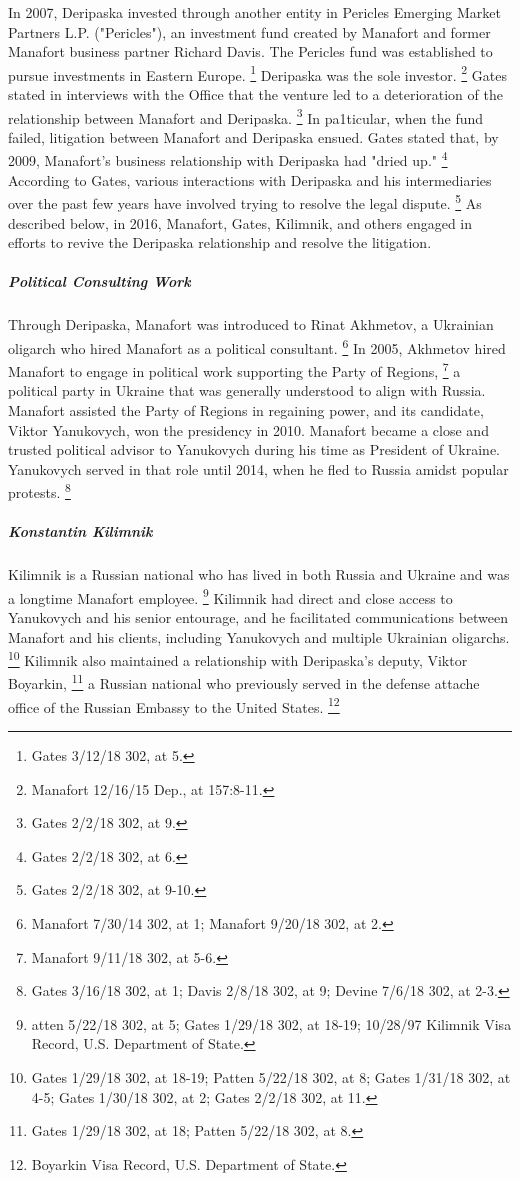 In 2007, Deripaska invested through another entity in Pericles Emerging Market Partners L.P. ("Pericles"), an investment fund created by Manafort and former Manafort business partner Richard Davis.
The Pericles fund was established to pursue investments in Eastern Europe.%
\footnote{Gates 3/12/18 302, at 5.}
Deripaska was the sole investor.%
\footnote{Manafort 12/16/15 Dep., at 157:8-11.}
Gates stated in interviews with the Office that the venture led to a deterioration of the relationship between Manafort and Deripaska.%
\footnote{Gates 2/2/18 302, at 9.}
In pa1ticular, when the fund failed, litigation between Manafort and Deripaska ensued.
Gates stated that, by 2009, Manafort's business relationship with Deripaska had "dried up."%
\footnote{Gates 2/2/18 302, at 6.}
According to Gates, various interactions with Deripaska and his intermediaries over the past few years have involved trying to resolve the legal dispute.%
\footnote{Gates 2/2/18 302, at 9-10.}
As described below, in 2016, Manafort, Gates, Kilimnik, and others engaged in efforts to revive the Deripaska relationship and resolve the litigation.

\subparagraph{Political Consulting Work}

Through Deripaska, Manafort was introduced to Rinat Akhmetov, a Ukrainian oligarch who hired Manafort as a political consultant.%
\footnote{Manafort 7/30/14 302, at 1;
Manafort 9/20/18 302, at 2.}
In 2005, Akhmetov hired Manafort to engage in political work supporting the Party of Regions,%
\footnote{Manafort 9/11/18 302, at 5-6.}
a political party in Ukraine that was generally understood to align with Russia.
Manafort assisted the Party of Regions in regaining power, and its candidate, Viktor Yanukovych, won the presidency in 2010.
Manafort became a close and trusted political advisor to Yanukovych during his time as President of Ukraine.
Yanukovych served in that role until 2014, when he fled to Russia amidst popular protests.%
\footnote{Gates 3/16/18 302, at 1;
Davis 2/8/18 302, at 9;
Devine 7/6/18 302, at 2-3.}

\subparagraph{Konstantin Kilimnik}

Kilimnik is a Russian national who has lived in both Russia and Ukraine and was a longtime Manafort employee.%
\footnote{atten 5/22/18 302, at 5;
Gates 1/29/18 302, at 18-19;
10/28/97 Kilimnik Visa Record, U.S. Department of State.}
Kilimnik had direct and close access to Yanukovych and his senior entourage, and he facilitated communications between Manafort and his clients, including Yanukovych and multiple Ukrainian oligarchs.%
\footnote{Gates 1/29/18 302, at 18-19;
Patten 5/22/18 302, at 8;
Gates 1/31/18 302, at 4-5;
Gates 1/30/18 302, at 2;
Gates 2/2/18 302, at 11.}
Kilimnik also maintained a relationship with Deripaska's deputy, Viktor Boyarkin,%
\footnote{Gates 1/29/18 302, at 18;
Patten 5/22/18 302, at 8.}
a Russian national who previously served in the defense attache office of the Russian Embassy to the United States.%
\footnote{Boyarkin Visa Record, U.S. Department of State.}

